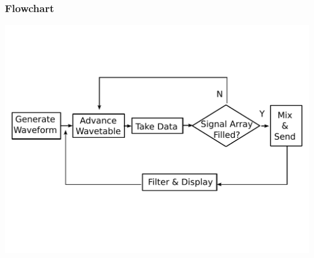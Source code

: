 \documentclass{beamer}
\begin{document}
%


\begin{frame}
\frametitle{Flowchart}
\includegraphics[scale=.5]{PSD_flowchart1}
\end{frame}
\end{document}
